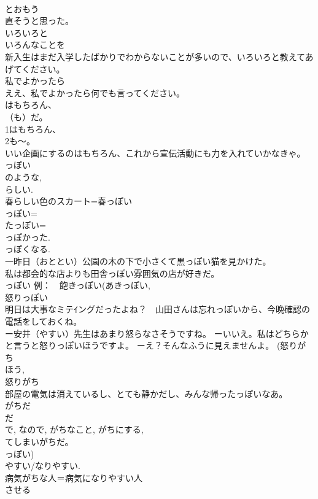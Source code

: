 \documentclass[8pt]{extreport}
\begin{document}
\begin{CJK}{UTF8}{min}
\\	とおもう 
\\	直そうと思った。　
\\	いろいろと
\\	いろんなことを
\\	新入生はまだ入学したばかりでわからないことが多いので、いろいろと教えてあげてください。 
\\	私でよかったら	
\\	ええ、私でよかったら何でも言ってください。 
\\	はもちろん、
\\	（も）だ。	
\\	1はもちろん、
\\	2も～。 
\\	いい企画にするのはもちろん、これから宣伝活動にも力を入れていかなきゃ。 
\\	っぽい	
\\	のような, 
\\	らしい. 
\\	春らしい色のスカート=春っぽい 
\\	っぽい= 
\\	たっぽい= 
\\	っぽかった. 
\\	っぽくなる. 
\\	一昨日（おととい）公園の木の下で小さくて黒っぽい猫を見かけた。 
\\	私は都会的な店よりも田舎っぽい雰囲気の店が好きだ。 
\\	っぽい 例：　飽きっぽい(あきっぽい, 
\\	怒りっぽい 
\\	明日は大事なミテｲングだったよね？　山田さんは忘れっぽいから、今晩確認の電話をしておくね。 
\\	ー安井（やすい）先生はあまり怒らなさそうですね。 ーいいえ。私はどちらかと言うと怒りっぽいほうですよ。 ーえ？そんなふうに見えませんよ。 (怒りがち 
\\	ほう, 
\\	怒りがち 
\\	部屋の電気は消えているし、とても静かだし、みんな帰ったっぽいなあ。 
\\	がちだ 
\\	だ 
\\	で, なので, がちなこと, がちにする, 
\\	てしまいがちだ。 
\\	っぽい) 
\\	やすい/なりやすい. 
\\	病気がちな人＝病気になりやすい人 
\\	させる 

\end{CJK}
\end{document}
